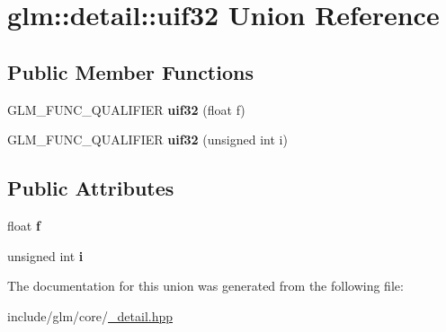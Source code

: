 \hypertarget{unionglm_1_1detail_1_1uif32}{\section{glm\-:\-:detail\-:\-:uif32 \-Union \-Reference}
\label{unionglm_1_1detail_1_1uif32}
}
\subsection*{\-Public \-Member \-Functions}
\begin{DoxyCompactItemize}
\item 
\hypertarget{unionglm_1_1detail_1_1uif32_ae86c2bd42a88f11e3217d14e46606971}{\-G\-L\-M\-\_\-\-F\-U\-N\-C\-\_\-\-Q\-U\-A\-L\-I\-F\-I\-E\-R {\bfseries uif32} (float f)}\label{unionglm_1_1detail_1_1uif32_ae86c2bd42a88f11e3217d14e46606971}

\item 
\hypertarget{unionglm_1_1detail_1_1uif32_af13a824828bd9601e53204ede38377da}{\-G\-L\-M\-\_\-\-F\-U\-N\-C\-\_\-\-Q\-U\-A\-L\-I\-F\-I\-E\-R {\bfseries uif32} (unsigned int i)}\label{unionglm_1_1detail_1_1uif32_af13a824828bd9601e53204ede38377da}

\end{DoxyCompactItemize}
\subsection*{\-Public \-Attributes}
\begin{DoxyCompactItemize}
\item 
\hypertarget{unionglm_1_1detail_1_1uif32_a5f697f84c5a8ec72c2f3a4f705f5bde8}{float {\bfseries f}}\label{unionglm_1_1detail_1_1uif32_a5f697f84c5a8ec72c2f3a4f705f5bde8}

\item 
\hypertarget{unionglm_1_1detail_1_1uif32_aff30e33bee63b0b9d1e930f0814da872}{unsigned int {\bfseries i}}\label{unionglm_1_1detail_1_1uif32_aff30e33bee63b0b9d1e930f0814da872}

\end{DoxyCompactItemize}


\-The documentation for this union was generated from the following file\-:\begin{DoxyCompactItemize}
\item 
include/glm/core/\hyperlink{__detail_8hpp}{\-\_\-detail.\-hpp}\end{DoxyCompactItemize}
